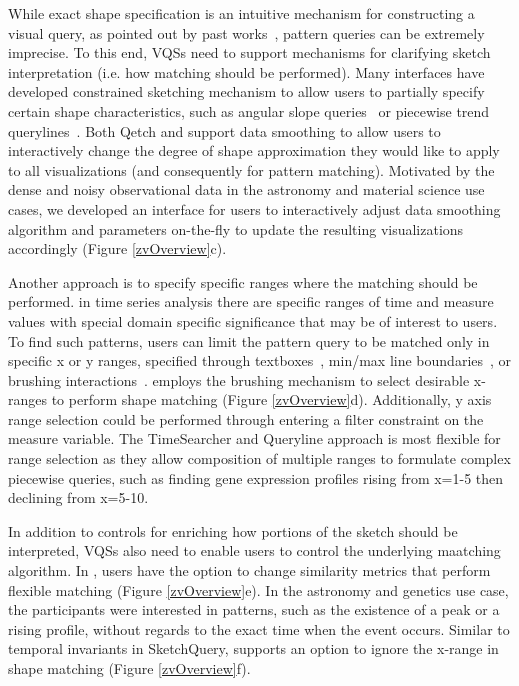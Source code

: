  While exact shape specification is an intuitive mechanism for constructing a visual query, as pointed out by past works~\cite{correll2016semantics,Holz2009,Eichmann2015}, pattern queries can be extremely imprecise. To this end, VQSs need to support mechanisms for clarifying sketch interpretation (i.e. how matching should be performed). Many interfaces have developed constrained sketching mechanism to allow users to partially specify certain shape characteristics, such as angular slope queries~\cite{Hochheiser2004} or piecewise trend querylines~\cite{ryall2005querylines}. Both Qetch and \zv support data smoothing to allow users to interactively change the degree of shape approximation they would like to apply to all visualizations (and consequently for pattern matching). Motivated by the dense and noisy observational data in the astronomy and material science use cases, we developed an interface for users to interactively adjust data smoothing algorithm and parameters on-the-fly to update the resulting visualizations accordingly (Figure \ref{zvOverview}c).
\par Another approach is to specify specific ranges where the matching should be performed. in time series analysis there are specific ranges of time and measure values with special domain specific significance that may be of interest to users. To find such patterns, users can limit the pattern query to be matched only in specific x or y ranges, specified through textboxes~\cite{wattenberg2001sketching,Mannino2018}, min/max line boundaries~\cite{ryall2005querylines}, or brushing interactions~\cite{Hochheiser2001}. \zv employs the brushing mechanism to select desirable x-ranges to perform shape matching (Figure \ref{zvOverview}d). Additionally, y axis range selection could be performed through entering a filter constraint on the measure variable. The TimeSearcher and Queryline approach is most flexible for range selection as they allow composition of multiple ranges to formulate complex piecewise queries, such as finding gene expression profiles rising from x=1-5 then declining from x=5-10.
\par In addition to controls for enriching how portions of the sketch should be interpreted, VQSs also need to enable users to control the underlying maatching algorithm. In \zv, users have the option to change similarity metrics that perform flexible matching (Figure \ref{zvOverview}e). In the astronomy and genetics use case, the participants were interested in patterns, such as the existence of a peak or a rising profile, without regards to the exact time when the event occurs. Similar to temporal invariants in SketchQuery, \zv supports an option to ignore the x-range in shape matching (Figure \ref{zvOverview}f). %
